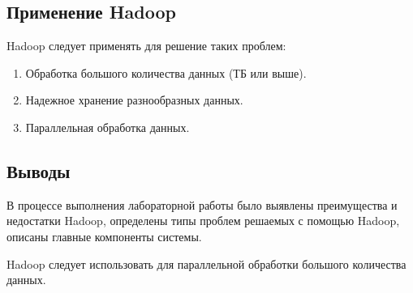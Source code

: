 \subsection{Применение Hadoop}
Hadoop следует применять для решение таких проблем:
\begin{enumerate}
    \item Обработка большого количества данных (ТБ или выше).
    \item Надежное хранение разнообразных данных.
    \item Параллельная обработка данных.
\end{enumerate}

\subsection*{Выводы}
В процессе выполнения лабораторной работы было выявлены преимущества и недостатки Hadoop, определены типы проблем решаемых с помощью Hadoop, описаны главные компоненты системы.

Hadoop следует использовать для параллельной обработки большого количества данных.


